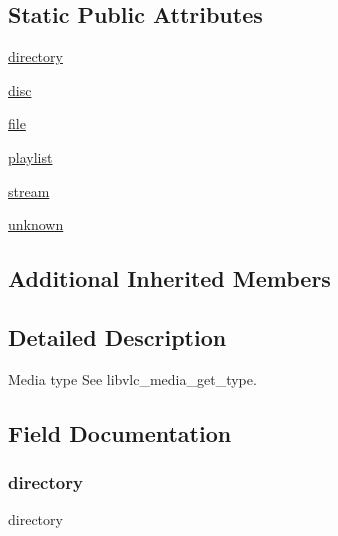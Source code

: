 \subsection*{Static Public Attributes}
\begin{DoxyCompactItemize}
\item 
\hyperlink{classvlc_1_1_media_type_aedf03b9517092eee7dae1588bbc00e19}{directory}
\item 
\hyperlink{classvlc_1_1_media_type_a1d37ecb63cf35316482fc5501d12958a}{disc}
\item 
\hyperlink{classvlc_1_1_media_type_a40a5d58ffa6e88aa578d6683ac413105}{file}
\item 
\hyperlink{classvlc_1_1_media_type_aa36722b6f83dd34214003df0de80b99e}{playlist}
\item 
\hyperlink{classvlc_1_1_media_type_ae489866f8220882799d2786ca0690e5b}{stream}
\item 
\hyperlink{classvlc_1_1_media_type_ac4bf32b8437be41aff6333570bb45edd}{unknown}
\end{DoxyCompactItemize}
\subsection*{Additional Inherited Members}


\subsection{Detailed Description}
\begin{DoxyVerb}Media type
See libvlc_media_get_type.
\end{DoxyVerb}
 

\subsection{Field Documentation}
\mbox{\label{classvlc_1_1_media_type_aedf03b9517092eee7dae1588bbc00e19}} 
\subsubsection{\texorpdfstring{directory}{directory}}
{\footnotesize\ttfamily directory\hspace{0.3cm}{\ttfamily [static]}}

\mbox{\label{classvlc_1_1_media_type_a1d37ecb63cf35316482fc5501d12958a}} 
